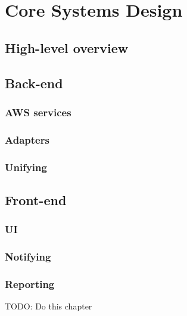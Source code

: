 \chapter{Core Systems Design}
\label{cha:core_system_design}
\section{High-level overview}
\section{Back-end}
\subsection{AWS services}
\subsection{Adapters}
\subsection{Unifying}
\section{Front-end}
\subsection{UI}
\subsection{Notifying}
\subsection{Reporting}

TODO: Do this chapter
